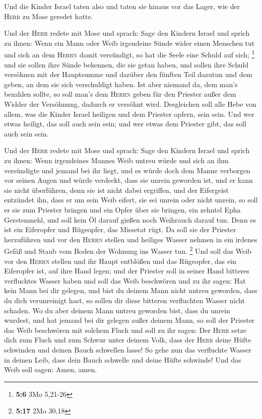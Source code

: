  Und die Kinder Israel taten also und taten sie hinaus vor
das Lager, wie der \textsc{Herr} zu Mose geredet hatte.

 Und der \textsc{Herr} redete mit Mose und sprach:
 Sage den Kindern Israel und sprich zu ihnen: Wenn ein
Mann oder Weib irgendeine Sünde wider einen Menschen tut und sich an dem
\textsc{Herrn} damit versündigt, so hat die Seele eine Schuld auf sich;
\footnote{\textbf{5:6} 3Mo 5,21-26}  und sie sollen ihre
Sünde bekennen, die sie getan haben, und sollen ihre Schuld versöhnen
mit der Hauptsumme und darüber den fünften Teil dazutun und dem geben,
an dem sie sich verschuldigt haben.  Ist aber niemand da,
dem man's bezahlen sollte, so soll man's dem \textsc{Herrn} geben für
den Priester außer dem Widder der Versöhnung, dadurch er versöhnt wird.
 Desgleichen soll alle Hebe von allem, was die Kinder
Israel heiligen und dem Priester opfern, sein sein.  Und
wer etwas heiligt, das soll auch sein sein; und wer etwas dem Priester
gibt, das soll auch sein sein.

 Und der \textsc{Herr} redete mit Mose und sprach:
 Sage den Kindern Israel und sprich zu ihnen: Wenn
irgendeines Mannes Weib untreu würde und sich an ihm versündigte
 und jemand bei ihr liegt, und es würde doch dem Manne
verborgen vor seinen Augen und würde verdeckt, dass sie unrein geworden
ist, und er kann sie nicht überführen, denn sie ist nicht dabei
ergriffen,  und der Eifergeist entzündet ihn, dass er um
sein Weib eifert, sie sei unrein oder nicht unrein,  so
soll er sie zum Priester bringen und ein Opfer über sie bringen, ein
zehntel Epha Gerstenmehl, und soll kein Öl darauf gießen noch Weihrauch
darauf tun. Denn es ist ein Eiferopfer und Rügeopfer, das Missetat rügt.
 Da soll sie der Priester herzuführen und vor den
\textsc{Herrn} stellen  und heiliges Wasser nehmen in ein
irdenes Gefäß und Staub vom Boden der Wohnung ins Wasser tun.
\footnote{\textbf{5:17} 2Mo 30,18}  Und soll das Weib vor
den \textsc{Herrn} stellen und ihr Haupt entblößen und das Rügeopfer,
das ein Eiferopfer ist, auf ihre Hand legen; und der Priester soll in
seiner Hand bitteres verfluchtes Wasser haben  und soll
das Weib beschwören und zu ihr sagen: Hat kein Mann bei dir gelegen, und
bist du deinem Mann nicht untreu geworden, dass du dich verunreinigt
hast, so sollen dir diese bitteren verfluchten Wasser nicht schaden.
 Wo du aber deinem Mann untreu geworden bist, dass du
unrein wurdest, und hat jemand bei dir gelegen außer deinem Mann,
 so soll der Priester das Weib beschwören mit solchem
Fluch und soll zu ihr sagen: Der \textsc{Herr} setze dich zum Fluch und
zum Schwur unter deinem Volk, dass der \textsc{Herr} deine Hüfte
schwinden und deinen Bauch schwellen lasse!  So gehe nun
das verfluchte Wasser in deinen Leib, dass dein Bauch schwelle und deine
Hüfte schwinde! Und das Weib soll sagen: Amen, amen.

